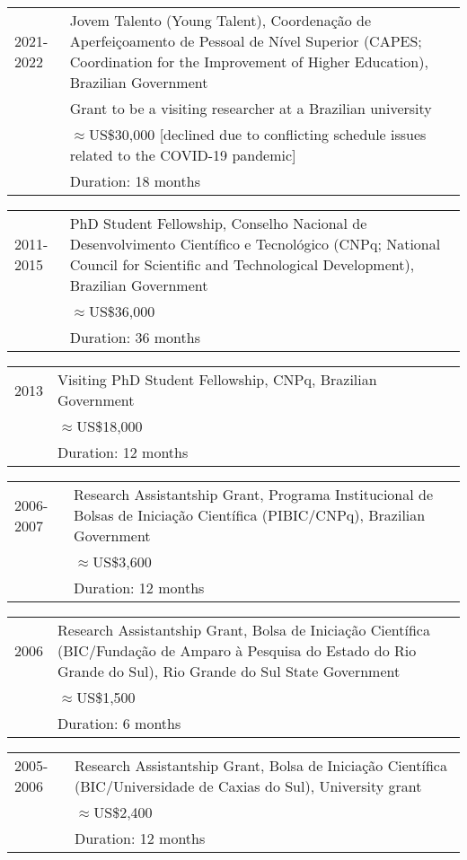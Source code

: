 \documentclass[letterpaper,10pt]{article}
\begin{document}
\begin{tabular}{p{1.6cm}p{15.2cm}}
 2021-2022   & Jovem Talento (Young Talent), Coordena\c{c}\~ao de Aperfei\c{c}oamento de Pessoal de N\'ivel Superior (CAPES; Coordination for the Improvement of Higher Education), Brazilian Government\\
 & Grant to be a visiting researcher at a Brazilian university\\
 & $\approx$US\$30,000 [declined due to conflicting schedule issues related to the COVID-19 pandemic]\\
    & Duration: 18 months
  \end{tabular}

\begin{tabular}{p{1.6cm}p{15.2cm}}
 2011-2015   & PhD Student Fellowship, Conselho Nacional de Desenvolvimento Cient\'i­fico e Tecnol\'ogico (CNPq; National Council for Scientific and Technological Development), Brazilian Government\\
 & $\approx$US\$36,000\\
    & Duration: 36 months
  \end{tabular}


\begin{tabular}{p{1.6cm}p{15.2cm}}
 2013   & Visiting PhD Student Fellowship, CNPq, Brazilian Government\\
 & $\approx$US\$18,000\\
    & Duration: 12 months
  \end{tabular}


\begin{tabular}{p{1.6cm}p{15.2cm}} 
 2006-2007   & Research Assistantship Grant, Programa Institucional de Bolsas de Inicia\c{c}\~ao Cient\'i­fica (PIBIC/CNPq), Brazilian Government\\
 & $\approx$US\$3,600\\
    & Duration: 12 months
  \end{tabular}

  
\begin{tabular}{p{1.6cm}p{15.2cm}}
 2006   & Research Assistantship Grant, Bolsa de Inicia\c{c}\~ao Cient\'ifica (BIC/Funda\c{c}\~ao de Amparo \`{a} Pesquisa do Estado do Rio Grande do Sul), Rio Grande do Sul State Government\\
 & $\approx$US\$1,500\\
    & Duration: 6 months
  \end{tabular}  


\begin{tabular}{p{1.6cm}p{15.2cm}} 
 2005-2006   & Research Assistantship Grant, Bolsa de Inicia\c{c}\~ao Cient\'i­fica (BIC/Universidade de Caxias do Sul), University grant\\
 & $\approx$US\$2,400\\
    & Duration: 12 months
  \end{tabular} 
\end{document}
